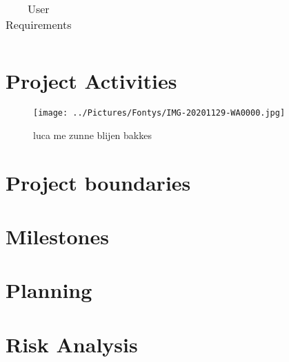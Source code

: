 \documentclass[*]{report}
\begin{document}
\begin{table}
\begin{tabular}{|p{1cm}|l|p{4cm}|l|p{3cm}|l|l|}
\hline
\end{tabular}
\caption{User Requirements}
\end{table}

\chapter{Project Activities}
\begin{figure}
\texttt{[image: ../Pictures/Fontys/IMG-20201129-WA0000.jpg]}
\caption{luca me zunne blijen bakkes	}
\end{figure}

\chapter{Project boundaries}
\lipsum[2-5]

\chapter{Milestones}
\lipsum[2-5]

\chapter{Planning}
\lipsum[2-5]

\chapter{Risk Analysis}
\lipsum[2-5]
\end{document}
